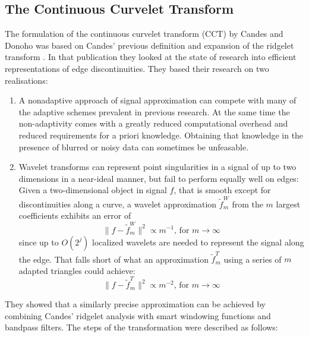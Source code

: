 \subsection{The Continuous Curvelet Transform}\label{sec:background_cct}

The formulation of the continuous curvelet transform (CCT) by Candes and Donoho
\autocite{candes_curvelets:_2000} was based on Candes' previous definition and
expansion of the ridgelet transform \autocite{candes_ridgelets:_1998}. In that
publication they looked at the state of research into efficient representations
of edge discontinuities. They based their research on two realisations:
\begin{enumerate}
    \item A nonadaptive approach of signal approximation can compete with many
        of the adaptive schemes prevalent in previous research. At the same
        time the non-adaptivity comes with a greatly reduced computational
        overhead and reduced requirements for a priori knowledge. Obtaining
        that knowledge in the presence of blurred or noisy data can sometimes
        be unfeasable.
    \item Wavelet transforms can represent point singularities in a signal of
        up to two dimensions in a near-ideal manner, but fail to perform
        equally well on edges: Given a two-dimensional object in signal $f$, that
        is smooth except for discontinuities along a curve, a wavelet
        approximation $\tilde{f}^W_m$ from the $m$ largest coefficients
        exhibits an error of
        \begin{equation*}
            \| f - \tilde{f}^W_m \|^2 \propto m^{-1} \text{, for } m \rightarrow \infty
        \end{equation*}
        since up to $O(2^j)$ localized wavelets are needed to represent the
        signal along the edge. That falls short of what an approximation
        $\tilde{f}^T_m$ using a series of $m$ adapted triangles could achieve:
        \begin{equation*}
            \| f - \tilde{f}^T_m \|^2 \propto m^{-2} \text{, for } m \rightarrow \infty
        \end{equation*}
\end{enumerate}

They showed that a similarly precise approximation can be achieved by combining
Candes' ridgelet analysis \autocite{candes_ridgelets:_1998} with smart
windowing functions and bandpass filters. The steps of the transformation were
described as follows:


